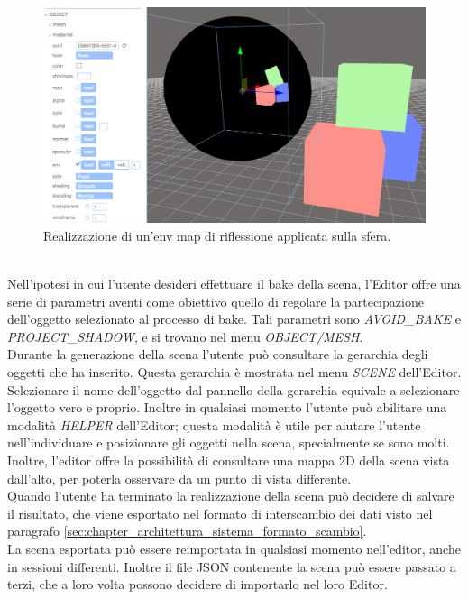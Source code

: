\\
\begin{figure}[htb]
 \centering
 \includegraphics[width=0.8\linewidth]{images/chapter_caso_uso/caso_uso_envmap.png}\hfill
 \caption[Effetti riflessione/rifrazione]{Realizzazione di un'env map di riflessione applicata sulla sfera.}
 \label{fig:caso_uso_envmap}
\end{figure}
\\
Nell’ipotesi in cui l’utente desideri effettuare il bake della scena, l’Editor offre una serie di parametri aventi come obiettivo quello di regolare la partecipazione dell’oggetto selezionato al processo di bake. Tali parametri sono \emph{AVOID\_BAKE} e \emph{PROJECT\_SHADOW}, e si trovano nel menu \emph{OBJECT/MESH}.
\\
Durante la generazione della scena l’utente può consultare la gerarchia degli oggetti che ha inserito. Questa gerarchia è mostrata nel menu \emph{SCENE} dell’Editor. 
\\
Selezionare il nome dell’oggetto dal pannello della gerarchia equivale a selezionare l’oggetto vero e proprio. 
Inoltre in qualsiasi momento l’utente può abilitare una modalità \emph{HELPER} dell’Editor; questa modalità è utile per aiutare l’utente nell’individuare e posizionare gli oggetti nella scena, specialmente se sono molti.
Inoltre, l’editor offre la possibilità di consultare una mappa 2D della scena vista dall’alto, per poterla osservare da un punto di vista differente.
\\
Quando l’utente ha terminato la realizzazione della scena può decidere di salvare il risultato, che viene esportato nel formato di interscambio dei dati visto nel paragrafo \ref{sec:chapter_architettura_sistema_formato_scambio}.
\\
La scena esportata può essere reimportata in qualsiasi momento nell’editor, anche in sessioni differenti. Inoltre il file JSON contenente la scena può essere passato a terzi, che a loro volta possono decidere di importarlo nel loro Editor.
